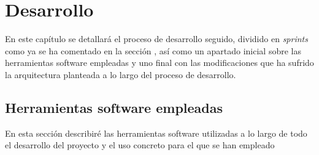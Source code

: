 \chapter{Desarrollo}
En este capítulo se detallará el proceso de desarrollo seguido, dividido en \textit{sprints} como ya se ha comentado en la sección , así como un apartado inicial sobre las herramientas software empleadas y uno final con las modificaciones que ha sufrido la arquitectura planteada a lo largo del proceso de desarrollo.

\section{Herramientas software empleadas}
\label{ch:herramientas}

En esta sección describiré las herramientas software utilizadas a lo largo de todo el desarrollo del proyecto y el uso concreto para el que se han empleado

